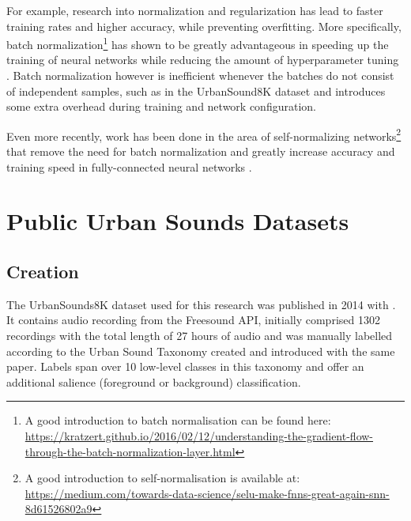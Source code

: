 For example, research into normalization and regularization has lead to faster training rates and higher accuracy, while preventing overfitting.  More specifically, batch normalization\footnote{A good introduction to batch normalisation can be found here: \url{https://kratzert.github.io/2016/02/12/understanding-the-gradient-flow-through-the-batch-normalization-layer.html}} has shown to be greatly advantageous in speeding up the training of neural networks while reducing the amount of hyperparameter tuning \cite{DBLP:journals/corr/IoffeS15}. Batch normalization however is inefficient whenever the batches do not consist of independent samples, such as in the UrbanSound8K dataset and introduces some extra overhead during training and network configuration.


Even more recently, work has been done in the area of self-normalizing networks\footnote{A good introduction to self-normalisation is available at: \url{https://medium.com/towards-data-science/selu-make-fnns-great-again-snn-8d61526802a9}} that remove the need for batch normalization and greatly increase accuracy and training speed in fully-connected neural networks \cite{DBLP:journals/corr/KlambauerUMH17}.



\chapter{Public Urban Sounds Datasets}

\section{Creation}

The UrbanSounds8K dataset used for this research was published in 2014 with \cite{Salamon:UrbanSound:ACMMM:14}. It contains audio recording from the Freesound API, initially comprised 1302 recordings with the total length of 27 hours of audio and was manually labelled according to the Urban Sound Taxonomy created and introduced with the same paper. Labels span over 10 low-level classes in this taxonomy and offer an additional salience (foreground or background) classification.

